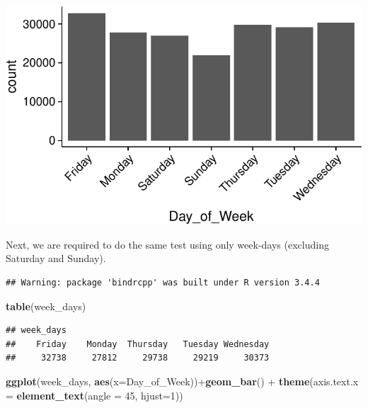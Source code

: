 \documentclass[]{article}
\newenvironment{Shaded}{\begin{snugshade}}{\end{snugshade}}
\newcommand{\KeywordTok}[1]{\textcolor[rgb]{0.13,0.29,0.53}{\textbf{{#1}}}}
\newcommand{\DataTypeTok}[1]{\textcolor[rgb]{0.13,0.29,0.53}{{#1}}}
\newcommand{\DecValTok}[1]{\textcolor[rgb]{0.00,0.00,0.81}{{#1}}}
\newcommand{\StringTok}[1]{\textcolor[rgb]{0.31,0.60,0.02}{{#1}}}
\newcommand{\CommentTok}[1]{\textcolor[rgb]{0.56,0.35,0.01}{\textit{{#1}}}}
\newcommand{\NormalTok}[1]{{#1}}
\begin{document}
\includegraphics{READMEv2_files/figure-latex/unnamed-chunk-12-1.pdf}

Next, we are required to do the same test using only week-days
(excluding Saturday and Sunday).

\begin{Shaded}
\end{Shaded}

\begin{verbatim}
## Warning: package 'bindrcpp' was built under R version 3.4.4
\end{verbatim}

\begin{Shaded}
\begin{Highlighting}[]
\KeywordTok{table}\NormalTok{(week_days)}
\end{Highlighting}
\end{Shaded}

\begin{verbatim}
## week_days
##    Friday    Monday  Thursday   Tuesday Wednesday 
##     32738     27812     29738     29219     30373
\end{verbatim}

\begin{Shaded}
\begin{Highlighting}[]
\KeywordTok{ggplot}\NormalTok{(week_days, }\KeywordTok{aes}\NormalTok{(}\DataTypeTok{x=}\NormalTok{Day_of_Week))+}\KeywordTok{geom_bar}\NormalTok{() +}
\StringTok{  }\KeywordTok{theme}\NormalTok{(}\DataTypeTok{axis.text.x =} \KeywordTok{element_text}\NormalTok{(}\DataTypeTok{angle =} \DecValTok{45}\NormalTok{, }\DataTypeTok{hjust=}\DecValTok{1}\NormalTok{)) }
\end{Highlighting}
\end{Shaded}
\end{document}
